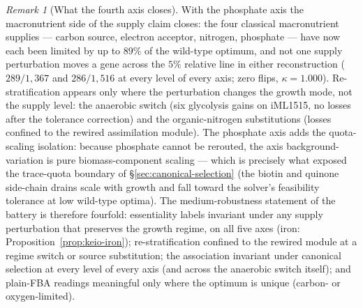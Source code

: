 \documentclass[11pt,a4paper]{article}
\theoremstyle{plain}
\theoremstyle{definition}
\theoremstyle{remark}
\newtheorem{remark}[theorem]{Remark}
\begin{document}
\begin{remark}[What the fourth axis closes]
\label{rem:keio-p-invariance}
With the phosphate axis the macronutrient side of the supply claim
closes: the four classical macronutrient supplies --- carbon
source, electron acceptor, nitrogen, phosphate --- have now each
been limited by up to $89\%$ of the wild-type optimum, and not one
supply perturbation moves a gene across the $5\%$ relative line in
either reconstruction ($289/1{,}367$ and $286/1{,}516$ at every
level of every axis; zero flips, $\kappa=1.000$). Re-stratification
appears only where the perturbation changes the growth mode, not
the supply level: the anaerobic switch (six glycolysis gains on
iML1515, no losses after the tolerance correction) and the
organic-nitrogen substitutions (losses confined to the rewired
assimilation module). The phosphate axis adds the quota-scaling
isolation: because phosphate cannot be rerouted, the axis
background-variation is pure biomass-component scaling --- which is
precisely what exposed the trace-quota boundary of
\S\ref{sec:canonical-selection} (the biotin and quinone side-chain
drains scale with growth and fall toward the solver's feasibility
tolerance at low wild-type optima). The medium-robustness statement
of the battery is therefore fourfold: essentiality labels invariant
under any supply perturbation that preserves the growth regime, on
all five axes (iron: Proposition~\ref{prop:keio-iron}); re-stratification confined to the rewired module at
a regime switch or source substitution; the association invariant
under canonical selection at every level of every axis (and across
the anaerobic switch itself); and plain-FBA readings meaningful
only where the optimum is unique (carbon- or oxygen-limited).
\end{remark}
\end{document}
